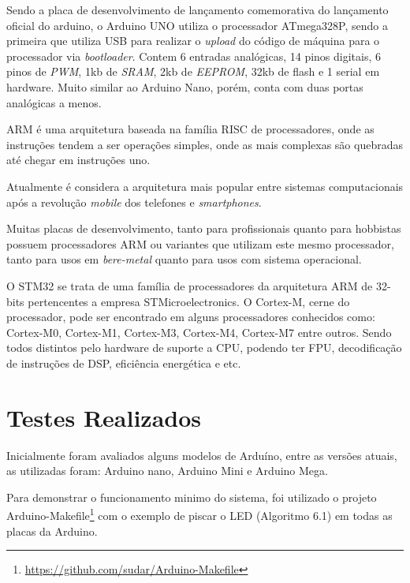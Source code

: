 Sendo a placa de desenvolvimento de lançamento comemorativa do lançamento oficial do arduino, o Arduino UNO utiliza o processador ATmega328P, sendo a primeira que utiliza USB para realizar o \textit{upload} do código de máquina para o processador via \textit{bootloader}. Contem 6 entradas analógicas, 14 pinos digitais, 6 pinos de \textit{PWM}, 1kb de \textit{SRAM}, 2kb de \textit{EEPROM}, 32kb de flash e 1 serial em hardware. Muito similar ao Arduino Nano, porém, conta com duas portas analógicas a menos.


ARM é uma arquitetura baseada na família RISC de processadores, onde as instruções tendem a ser operações simples, onde as mais complexas são quebradas até chegar em instruções uno.

Atualmente é considera a arquitetura mais popular entre sistemas computacionais após a revolução \textit{mobile} dos telefones e \textit{smartphones}.

Muitas placas de desenvolvimento, tanto para profissionais quanto para hobbistas possuem processadores ARM ou variantes que utilizam este mesmo processador, tanto para usos em \textit{bere-metal} quanto para usos com sistema operacional.


O STM32 se trata de uma família de processadores da arquitetura ARM de 32-bits pertencentes a empresa STMicroelectronics. O Cortex-M, cerne do processador, pode ser encontrado em alguns processadores conhecidos como: Cortex-M0, Cortex-M1, Cortex-M3, Cortex-M4, Cortex-M7 entre outros. Sendo todos distintos pelo hardware de suporte a CPU, podendo ter FPU, decodificação de instruções de DSP, eficiência energética e etc.


\section{Testes Realizados}

Inicialmente foram avaliados alguns modelos de Arduíno, entre as versões atuais, as utilizadas foram: Arduino nano, Arduino Mini e Arduino Mega.

Para demonstrar o funcionamento minimo do sistema, foi utilizado o projeto Arduino-Makefile\footnote{\url{https://github.com/sudar/Arduino-Makefile}} com o exemplo de piscar o LED (Algoritmo 6.1) em todas as placas da Arduino.

